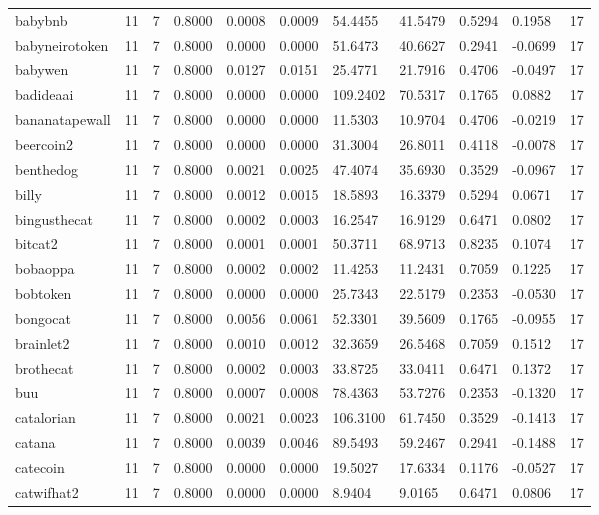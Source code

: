 \begin{table}[htbp]
\begin{tabular}{lllllllllll}
babybnb & 11 & 7 & 0.8000 & 0.0008 & 0.0009 & 54.4455 & 41.5479 & 0.5294 & 0.1958 & 17 \\
babyneirotoken & 11 & 7 & 0.8000 & 0.0000 & 0.0000 & 51.6473 & 40.6627 & 0.2941 & -0.0699 & 17 \\
babywen & 11 & 7 & 0.8000 & 0.0127 & 0.0151 & 25.4771 & 21.7916 & 0.4706 & -0.0497 & 17 \\
badideaai & 11 & 7 & 0.8000 & 0.0000 & 0.0000 & 109.2402 & 70.5317 & 0.1765 & 0.0882 & 17 \\
bananatapewall & 11 & 7 & 0.8000 & 0.0000 & 0.0000 & 11.5303 & 10.9704 & 0.4706 & -0.0219 & 17 \\
beercoin2 & 11 & 7 & 0.8000 & 0.0000 & 0.0000 & 31.3004 & 26.8011 & 0.4118 & -0.0078 & 17 \\
benthedog & 11 & 7 & 0.8000 & 0.0021 & 0.0025 & 47.4074 & 35.6930 & 0.3529 & -0.0967 & 17 \\
billy & 11 & 7 & 0.8000 & 0.0012 & 0.0015 & 18.5893 & 16.3379 & 0.5294 & 0.0671 & 17 \\
bingusthecat & 11 & 7 & 0.8000 & 0.0002 & 0.0003 & 16.2547 & 16.9129 & 0.6471 & 0.0802 & 17 \\
bitcat2 & 11 & 7 & 0.8000 & 0.0001 & 0.0001 & 50.3711 & 68.9713 & 0.8235 & 0.1074 & 17 \\
bobaoppa & 11 & 7 & 0.8000 & 0.0002 & 0.0002 & 11.4253 & 11.2431 & 0.7059 & 0.1225 & 17 \\
bobtoken & 11 & 7 & 0.8000 & 0.0000 & 0.0000 & 25.7343 & 22.5179 & 0.2353 & -0.0530 & 17 \\
bongocat & 11 & 7 & 0.8000 & 0.0056 & 0.0061 & 52.3301 & 39.5609 & 0.1765 & -0.0955 & 17 \\
brainlet2 & 11 & 7 & 0.8000 & 0.0010 & 0.0012 & 32.3659 & 26.5468 & 0.7059 & 0.1512 & 17 \\
brothecat & 11 & 7 & 0.8000 & 0.0002 & 0.0003 & 33.8725 & 33.0411 & 0.6471 & 0.1372 & 17 \\
buu & 11 & 7 & 0.8000 & 0.0007 & 0.0008 & 78.4363 & 53.7276 & 0.2353 & -0.1320 & 17 \\
catalorian & 11 & 7 & 0.8000 & 0.0021 & 0.0023 & 106.3100 & 61.7450 & 0.3529 & -0.1413 & 17 \\
catana & 11 & 7 & 0.8000 & 0.0039 & 0.0046 & 89.5493 & 59.2467 & 0.2941 & -0.1488 & 17 \\
catecoin & 11 & 7 & 0.8000 & 0.0000 & 0.0000 & 19.5027 & 17.6334 & 0.1176 & -0.0527 & 17 \\
catwifhat2 & 11 & 7 & 0.8000 & 0.0000 & 0.0000 & 8.9404 & 9.0165 & 0.6471 & 0.0806 & 17 \\

\end{tabular}
\end{table}

